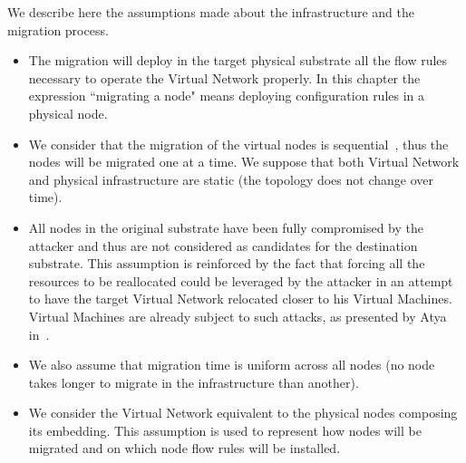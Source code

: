 \label{sec:mdp-system-hypotheses}
We describe here the assumptions made about the infrastructure and the migration process.

\begin{itemize}
    \item
    The migration will deploy in the target physical substrate all the flow rules necessary to operate the Virtual Network properly. In this chapter the expression ``migrating a node" means deploying configuration rules in a physical node.
    
    \item
    We consider that the migration of the virtual nodes is sequential~\cite{Lime-Ghorbani2014}, thus the nodes will be migrated one at a time.
    We suppose that both Virtual Network and physical infrastructure are static (\ie the topology does not change over time).
    
    \item All nodes in the original substrate have been fully compromised by the attacker and thus are not considered as candidates for the destination substrate.  
    This assumption is reinforced by the fact that forcing all the resources to be reallocated could be leveraged by the attacker in an attempt to have the target Virtual Network relocated closer to his Virtual Machines.
    Virtual Machines are already subject to such attacks, as presented by Atya \etal in~\cite{stalling-atya2017,malicious-atya2017}.

    \item
    We also assume that migration time is uniform across all nodes (\ie no node takes longer to migrate in the infrastructure than another).
    
    \item
     We consider the Virtual Network equivalent to the physical nodes composing its embedding.
     This assumption is used to represent how nodes will be migrated and on which node flow rules will be installed. 
\end{itemize}


